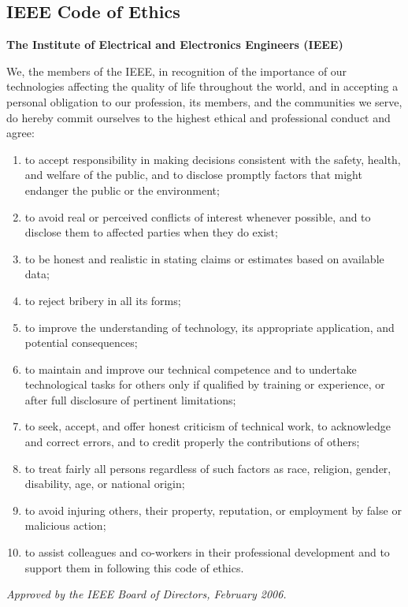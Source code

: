 \documentclass[12pt,letterpaper]{article}
\begin{document}
\begin{appendices}

\section{IEEE Code of Ethics}

\textbf{The Institute of Electrical and Electronics Engineers (IEEE)}

\medskip

We, the members of the IEEE, in recognition of the importance of our technologies affecting the quality of life throughout the world, and in accepting a personal obligation to our profession, its members, and the communities we serve, do hereby commit ourselves to the highest ethical and professional conduct and agree:

\begin{enumerate}
    \item to accept responsibility in making decisions consistent with the safety, health, and welfare of the public, and to disclose promptly factors that might endanger the public or the environment;
    
    \item to avoid real or perceived conflicts of interest whenever possible, and to disclose them to affected parties when they do exist;
    
    \item to be honest and realistic in stating claims or estimates based on available data;
    
    \item to reject bribery in all its forms;
    
    \item to improve the understanding of technology, its appropriate application, and potential consequences;
    
    \item to maintain and improve our technical competence and to undertake technological tasks for others only if qualified by training or experience, or after full disclosure of pertinent limitations;
    
    \item to seek, accept, and offer honest criticism of technical work, to acknowledge and correct errors, and to credit properly the contributions of others;
    
    \item to treat fairly all persons regardless of such factors as race, religion, gender, disability, age, or national origin;
    
    \item to avoid injuring others, their property, reputation, or employment by false or malicious action;
    
    \item to assist colleagues and co-workers in their professional development and to support them in following this code of ethics.
\end{enumerate}

\medskip

\noindent\textit{Approved by the IEEE Board of Directors, February 2006.}

\end{appendices}
\end{document}
